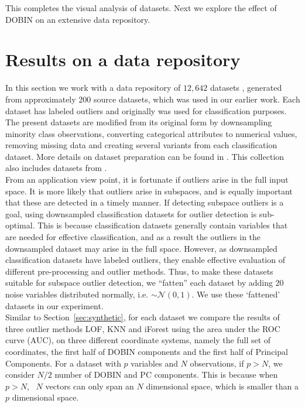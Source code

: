 \documentclass[a4paper,11pt]{article}
\begin{document}
\noindent
This completes the visual analysis of datasets. Next we  explore the effect of DOBIN on an extensive data repository. 

\section{Results on a data repository}\label{sec:DatRepo}
In this section we work with a data repository of $12,642$ datasets \citep{datasets}, generated from approximately $200$ source datasets, which was used in our earlier work. Each dataset has labeled outliers and  originally was used for classification purposes. The present datasets are modified from its original form by downsampling minority class observations, converting categorical attributes to numerical values, removing missing data and creating several variants from each classification dataset. More details on dataset preparation can be found in \cite{kandanaarachchi2018normalization}. This collection also includes datasets from \cite{campos2016evaluation}. \\

From an application view point, it is fortunate if outliers arise in the full input space. It is more likely that outliers arise in subspaces, and is equally important that these are detected in a timely manner. If detecting subspace outliers is a goal, using downsampled classification datasets for outlier detection is sub-optimal. This is  because classification datasets generally contain variables that are needed for effective classification, and as a result the  outliers in the downsampled dataset may arise in the full space. However, as downsampled classification datasets have labeled outliers, they enable effective evaluation of different pre-processing and outlier methods. Thus, to make these datasets suitable for subspace outlier detection, we ``fatten'' each dataset by adding  $20$ noise variables distributed normally, i.e. $\sim \mathcal{N}(0,1)$.  We use  these `fattened' datasets in our experiment.  \\


Similar to Section~\ref{sec:synthetic}, for each dataset we compare the results of three outlier methods LOF, KNN and iForest using the area under the ROC curve (AUC), on three different coordinate systems, namely the full set of coordinates, the first half of DOBIN components and the first half of Principal Components. For a dataset with $p$ variables and $N$ observations, if $p > N$, we consider $N/2$ number of DOBIN and PC components. This is because when $p >N$, \,  $N$  vectors can only span an $N$ dimensional space, which is smaller than a $p$ dimensional space. \\ %
\end{document}
